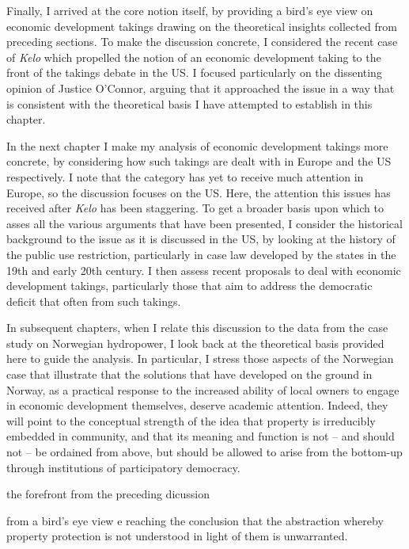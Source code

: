 Finally, I arrived at the core notion itself, by providing a bird's eye view on economic development takings drawing on the theoretical insights collected from preceding sections. To make the discussion concrete, I considered the recent case of {\it Kelo} which propelled the notion of an economic development taking to the front of the takings debate in the US. I focused particularly on the dissenting opinion of Justice O'Connor, arguing that it approached the issue in a way that is consistent with the theoretical basis I have attempted to establish in this chapter. 

In the next chapter I make my analysis of economic development takings more concrete, by considering how such takings are dealt with in Europe and the US respectively. I note that the category has yet to receive much attention in Europe, so the discussion focuses on the US. Here, the attention this issues has received after {\it Kelo} has been staggering. To get a broader basis upon which to asses all the various arguments that have been presented, I consider the historical background to the issue as it is discussed in the US, by looking at the history of the public use restriction, particularly in case law developed by the states in the 19th and early 20th century. I then assess recent proposals to deal with economic development takings, particularly those that aim to address the democratic deficit that often from such takings.

In subsequent chapters, when I relate this discussion to the data from the case study on Norwegian hydropower, I look back at the theoretical basis provided here to guide the analysis. In particular, I stress those aspects of the Norwegian case that illustrate that the solutions that have developed on the ground in Norway, as a practical response to the increased ability of local owners to engage in economic development themselves, deserve academic attention. Indeed, they will point to the conceptual strength of the idea that property is irreducibly embedded in community, and that its meaning and function is not -- and should not -- be ordained from above, but should be allowed to arise from the bottom-up through institutions of participatory democracy.









 the forefront  from the preceding dicussion 


from a bird's eye view
e
 reaching the conclusion that the abstraction whereby property protection is not understood in light of them is unwarranted. 





